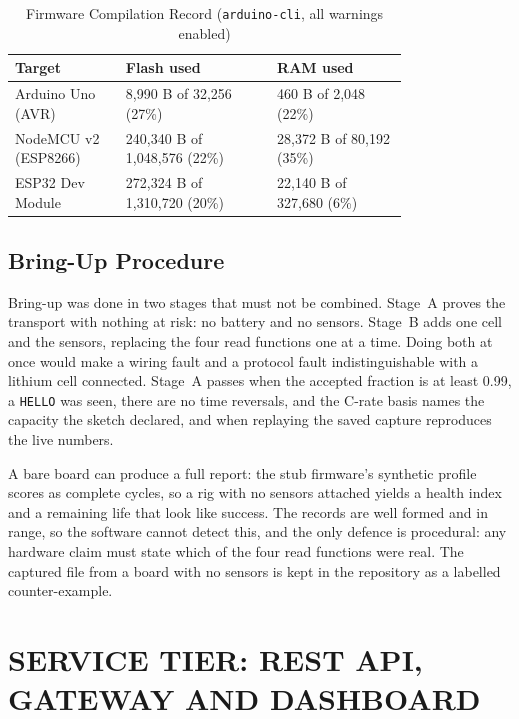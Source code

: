 \begin{table}[htbp]
	\caption{Firmware Compilation Record (\texttt{arduino-cli}, all warnings enabled)}
	\centering
	\small
	\renewcommand{\arraystretch}{1.15}
	\setlength{\tabcolsep}{4pt}
	\begin{tabular}{|L{0.22\linewidth}|C{0.3\linewidth}|C{0.26\linewidth}|}
		\hline
		\textbf{Target} & \textbf{Flash used} & \textbf{RAM used} \\
		\hline
		Arduino Uno (AVR) & 8,990 B of 32,256 (27\%) & 460 B of 2,048 (22\%) \\
		\hline
		NodeMCU v2 (ESP8266) & 240,340 B of 1,048,576 (22\%) & 28,372 B of 80,192 (35\%) \\
		\hline
		ESP32 Dev Module & 272,324 B of 1,310,720 (20\%) & 22,140 B of 327,680 (6\%) \\
		\hline
	\end{tabular}
	\label{tab:compile}
\end{table}

\subsection{Bring-Up Procedure}

Bring-up was done in two stages that must not be combined. Stage~A proves the transport with nothing at risk: no battery and no sensors. Stage~B adds one cell and the sensors, replacing the four read functions one at a time. Doing both at once would make a wiring fault and a protocol fault indistinguishable with a lithium cell connected. Stage~A passes when the accepted fraction is at least 0.99, a \texttt{HELLO} was seen, there are no time reversals, and the C-rate basis names the capacity the sketch declared, and when replaying the saved capture reproduces the live numbers.

A bare board can produce a full report: the stub firmware's synthetic profile scores as complete cycles, so a rig with no sensors attached yields a health index and a remaining life that look like success. The records are well formed and in range, so the software cannot detect this, and the only defence is procedural: any hardware claim must state which of the four read functions were real. The captured file from a board with no sensors is kept in the repository as a labelled counter-example.

\section{SERVICE TIER: REST API, GATEWAY AND DASHBOARD}
\label{sec:impl-api}

